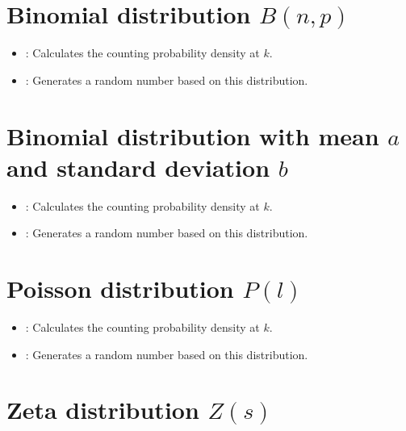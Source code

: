 \section{Binomial distribution \texorpdfstring{$B(n,p)$}{B(n,p)}}

\begin{itemize}

\item
{}:
Calculates the counting probability density at $k$.

\item
{}:
Generates a random number based on this distribution.

\end{itemize}



\section{Binomial distribution with mean \texorpdfstring{$a$}{a} and standard deviation \texorpdfstring{$b$}{b}}

\begin{itemize}

\item
{}:
Calculates the counting probability density at $k$.

\item
{}:
Generates a random number based on this distribution.

\end{itemize}



\section{Poisson distribution \texorpdfstring{$P(l)$}{P(l)}}

\begin{itemize}

\item
{}:
Calculates the counting probability density at $k$.

\item
{}:
Generates a random number based on this distribution.

\end{itemize}



\section{Zeta distribution \texorpdfstring{$Z(s)$}{Z(s)}}


